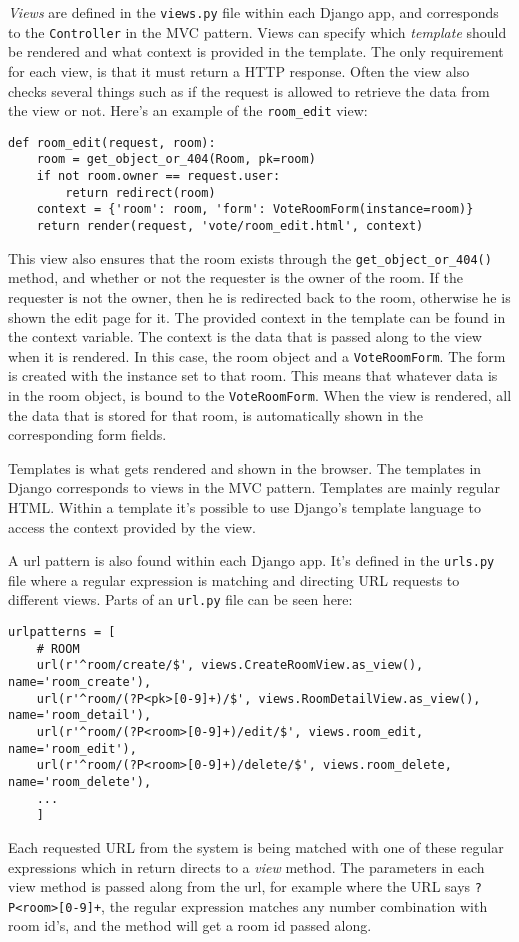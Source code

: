 \emph{Views} are defined in the \texttt{views.py} file within each Django app, and corresponds to the \texttt{Controller} in the MVC pattern. Views can specify which \emph{template} should be rendered and what context is provided in the template. The only requirement for each view, is that it must return a HTTP response. Often the view also checks several things such as if the request is allowed to retrieve the data from the view or not. Here's an example of the \texttt{room\_edit} view:

\begin{lstlisting}[caption=The Room edit method, label=lst:room-edit-method]
def room_edit(request, room):
    room = get_object_or_404(Room, pk=room)
    if not room.owner == request.user:
        return redirect(room)
    context = {'room': room, 'form': VoteRoomForm(instance=room)}
    return render(request, 'vote/room_edit.html', context)
\end{lstlisting}
This view also ensures that the room exists through the \texttt{get\_object\_or\_404()} method, and whether or not the requester is the owner of the room. If the requester is not the owner, then he is redirected back to the room, otherwise he is shown the edit page for it. The provided context in the template can be found in the context variable. The context is the data that is passed along to the view when it is rendered. In this case, the room object and a \texttt{VoteRoomForm}. The form is created with the instance set to that room. This means that whatever data is in the room object, is bound to the \texttt{VoteRoomForm}. When the view is rendered, all the data that is stored for that room, is automatically shown in the corresponding form fields. 

Templates is what gets rendered and shown in the browser. The templates in Django corresponds to views in the MVC pattern. Templates are mainly regular HTML. Within a template it's possible to use Django's template language to access the context provided by the view.

A url pattern is also found within each Django app. It's defined in the \texttt{urls.py} file where a regular expression is matching and directing URL requests to different views. Parts of an \texttt{url.py} file can be seen here:

\begin{lstlisting}[caption=URL patterns from the vote app, label=lst:urlpatterns]
urlpatterns = [
    # ROOM
    url(r'^room/create/$', views.CreateRoomView.as_view(), name='room_create'),
    url(r'^room/(?P<pk>[0-9]+)/$', views.RoomDetailView.as_view(), name='room_detail'),
    url(r'^room/(?P<room>[0-9]+)/edit/$', views.room_edit, name='room_edit'),
    url(r'^room/(?P<room>[0-9]+)/delete/$', views.room_delete, name='room_delete'),
    ...
    ]
\end{lstlisting}
Each requested URL from the system is being matched with one of these regular expressions which in return directs to a \emph{view} method. The parameters in each view method is passed along from the url, for example where the URL says \texttt{?P<room>[0-9]+}, the regular expression matches any number combination with room id's, and the method will get a room id passed along.

